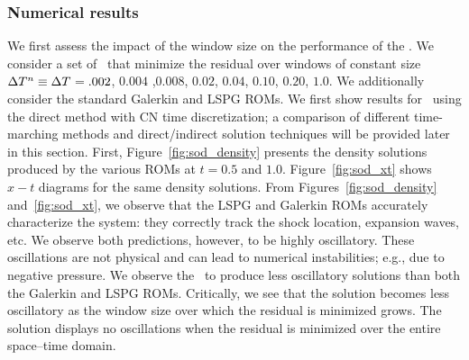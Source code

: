 \subsubsection{Numerical results}
We first assess the impact of the window size on the performance of the \methodAcronymROMs.  We consider a set of \methodAcronymROMs\ that minimize the residual over windows of constant size 
$\Delta T^{n} \equiv \Delta T^{} =  .002$, $0.004$ ,$0.008$, $0.02$, $0.04$, $0.10$, $0.20$, $1.0$. We additionally consider the standard Galerkin and LSPG ROMs. We first show results for \methodAcronymROMs\ using the direct method with CN time discretization; a comparison of different time-marching methods and direct/indirect solution techniques will be provided later in this section. 
First, Figure~\ref{fig:sod_density} presents the density solutions produced by the various ROMs at $t = 0.5$ and $1.0$. Figure~\ref{fig:sod_xt} shows 
$x-t$ diagrams for the same density solutions. From Figures~\ref{fig:sod_density} and~\ref{fig:sod_xt}, we observe that the LSPG and Galerkin ROMs accurately characterize 
the system: they correctly track the shock location, expansion waves, etc. We observe both predictions, however, to be highly oscillatory. These oscillations are 
not physical and can lead to numerical instabilities; e.g., due to negative pressure. We observe the \methodAcronymROMs\ to produce less oscillatory solutions than both 
the Galerkin and LSPG ROMs. Critically, we see that the solution becomes less oscillatory as the window size over which the residual is minimized grows. The solution displays no oscillations when the residual is minimized over the entire space--time domain. 

